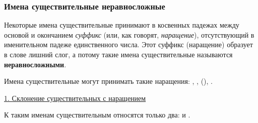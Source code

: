 \documentclass[11pt,a4paper,oneside]{memoir}
\begin{document}
                \subsubsection{Имена существительные неравносложные}

    Некоторые имена существительные принимают в косвенных падежах между основой и окончанием \emph{суффикс} (или, как говорят, \emph{наращение}), отсутствующий в именительном падеже единственного числа. Этот суффикс (наращение) образует в слове лишний слог, а потому такие имена существительные называются \textbf{неравносложными}.
    
    Имена существительные могут принимать такие наращения: {}, {}, {} ({}), {}.
    
    \bigskip\underline{1. Склонение существительных с наращением {}}
    \bigskip
    
    К таким именам существительным относятся только два: {} и {}.
    
\end{document}

